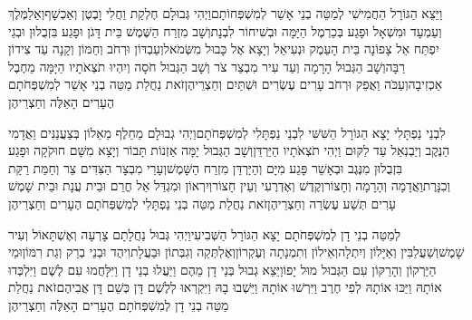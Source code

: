 \documentclass[../main/main.tex]{subfiles}
\begin{document}
\begin{multicols*}{\ncols}
וַיֵּצֵא הַגּוֹרָל הַחֲמִישִׁי לְמַטֵּה בְנֵי אָשֵׁר לְמִשְׁפְּחוֹתָם\PreVerseSpace{}וַיְהִי גְּבוּלָם חֶלְקַת וַחֲלִי וָבֶטֶן וְאַכְשָׁף\PreVerseSpace{}וְאַלַמֶּלֶךְ וְעַמְעָד וּמִשְׁאָל וּפָגַע בְּכַרְמֶל הַיָּמָּה וּבְשִׁיחוֹר לִבְנָת\PreVerseSpace{}וְשָׁב מִזְרַח הַשֶּׁמֶשׁ בֵּית דָּגֹן וּפָגַע בִּזְבֻלוּן וּבְגֵי יִפְתַּח אֵל צָפוֹנָה בֵּית הָעֵמֶק וּנְעִיאֵל וְיָצָא אֶל כָּבוּל מִשְּׂמֹאל\PreVerseSpace{}וְעַבְדּוֹן\SubEnd{} וּרְחֹב וְחַמּוֹן וְקָנָה עַד צִידוֹן רַבָּה\PreVerseSpace{}וְשָׁב הַגְּבוּל הָרָמָה וְעַד עִיר מִבְצַר צֹר וְשָׁב הַגְּבוּל חֹסָה וְיִהְיוּ תֹצְאֹתָיו הַיָּמָּה מֵחֶבֶל אַכְזִיבָה\PreVerseSpace{}וְעַכֹּה\SubEnd{} וַאֲפֵק וּרְחֹב עָרִים עֶשְׂרִים וּשְׁתַּיִם וְחַצְרֵיהֶן\PreVerseSpace{}זֹאת נַחֲלַת מַטֵּה בְנֵי אָשֵׁר לְמִשְׁפְּחֹתָם הֶעָרִים הָאֵלֶּה וְחַצְרֵיהֶן\OpenSection{}\par
{}לִבְנֵי נַפְתָּלִי יָצָא הַגּוֹרָל הַשִּׁשִּׁי לִבְנֵי נַפְתָּלִי לְמִשְׁפְּחֹתָם\PreVerseSpace{}וַיְהִי גְבוּלָם מֵחֵלֶף מֵאֵלוֹן בְּצַעֲנַנִּים וַאֲדָמִי הַנֶּקֶב וְיַבְנְאֵל עַד לַקּוּם וַיְהִי תֹצְאֹתָיו הַיַּרְדֵּן\PreVerseSpace{}וְשָׁב הַגְּבוּל יָמָּה אַזְנוֹת תָּבוֹר וְיָצָא מִשָּׁם חוּקֹקָה וּפָגַע בִּזְבֻלוּן מִנֶּגֶב וּבְאָשֵׁר פָּגַע מִיָּם וְהַיַּרְדֵּן\SubEnd{} מִזְרַח הַשָּׁמֶשׁ\PreVerseSpace{}וְעָרֵי מִבְצָר הַצִּדִּים צֵר וְחַמַּת רַקַּת וְכִנָּרֶת\PreVerseSpace{}וַאֲדָמָה וְהָרָמָה וְחָצוֹר\PreVerseSpace{}וְקֶדֶשׁ וְאֶדְרֶעִי וְעֵין חָצוֹר\PreVerseSpace{}וְיִרְאוֹן וּמִגְדַּל אֵל חֳרֵם וּבֵית עֲנָת וּבֵית שָׁמֶשׁ עָרִים תְּשַׁע עֶשְׂרֵה וְחַצְרֵיהֶן\PreVerseSpace{}זֹאת נַחֲלַת מַטֵּה בְנֵי נַפְתָּלִי לְמִשְׁפְּחֹתָם הֶעָרִים וְחַצְרֵיהֶן\OpenSection{}\par
{}לְמַטֵּה בְנֵי דָן לְמִשְׁפְּחֹתָם יָצָא הַגּוֹרָל הַשְּׁבִיעִי\PreVerseSpace{}וַיְהִי גְּבוּל נַחֲלָתָם צָרְעָה וְאֶשְׁתָּאוֹל וְעִיר שָׁמֶשׁ\PreVerseSpace{}וְשַׁעֲלַבִּין וְאַיָּלוֹן וְיִתְלָה\PreVerseSpace{}וְאֵילוֹן וְתִמְנָתָה וְעֶקְרוֹן\PreVerseSpace{}וְאֶלְתְּקֵה וְגִבְּתוֹן וּבַעֲלָת\PreVerseSpace{}וִיהֻד וּבְנֵי בְרַק וְגַת רִמּוֹן\PreVerseSpace{}וּמֵי הַיַּרְקוֹן וְהָרַקּוֹן עִם הַגְּבוּל מוּל יָפוֹ\PreVerseSpace{}וַיֵּצֵא גְבוּל בְּנֵי דָן מֵהֶם וַיַּעֲלוּ בְנֵי דָן וַיִּלָּחֲמוּ עִם לֶשֶׁם וַיִּלְכְּדוּ אוֹתָהּ וַיַּכּוּ אוֹתָהּ לְפִי חֶרֶב וַיִּרְשׁוּ אוֹתָהּ וַיֵּשְׁבוּ בָהּ וַיִּקְרְאוּ לְלֶשֶׁם דָּן כְּשֵׁם דָּן אֲבִיהֶם\PreVerseSpace{}זֹאת נַחֲלַת מַטֵּה בְנֵי דָן לְמִשְׁפְּחֹתָם הֶעָרִים הָאֵלֶּה וְחַצְרֵיהֶן\OpenSection{}\par

\end{multicols*}
\end{document}
